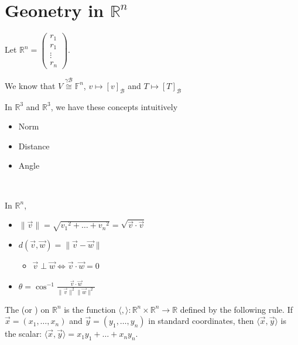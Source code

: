 \documentclass[11pt,fleqn]{book} %
\begin{document}
\section{Geonetry in $\mathbb{R}^n$}

Let $\mathbb{R}^n = \begin{pmatrix} r_1 \\ r_1 \\ \vdots \\ r_n \end{pmatrix}$. 

\noindent We know that $V \overset{\gamma\mathcal{B}}{\cong} \mathbb{F}^n$, $v \mapsto [v]_\mathcal{B}$ and $T \mapsto [T]_\mathcal{B}$

\noindent In $\mathbb{R}^3$ and $\mathbb{R}^3$, we have these concepts intuitively
\begin{itemize}
    \item Norm
    \item Distance
    \item Angle
\end{itemize}

{~~~}

\noindent In $\mathbb{R}^n$, 
\begin{itemize}
    \item $\|\vec{v}\| = \sqrt{{v_1}^2 + \dots + {v_n}^2} = \sqrt{\vec{v} \cdot \vec{v}}$
    \item $d(\vec{v}, \vec{w}) = \|\vec{v} - \vec{w}\|$
    \begin{itemize}
        \item $\vec{v} \perp \vec{w} \iff \vec{v} \cdot \vec{w} = 0$
    \end{itemize}
    \item $\theta = \cos^{-1}\frac{\vec{v} \cdot \vec{w}}{\|\vec{v}\|^2 \|\vec{w}\|^2}$
\end{itemize}

\setcounter{chapter}{4}\label{Def4_3_1}
\begin{definition}
    The  (or ) on $\mathbb{R}^n$ is the function $\langle , \rangle : \mathbb{R}^n \times \mathbb{R}^n \to \mathbb{R}$ defined by the following rule. If $\vec{x} = (x_1, \dots, x_n)$ and $\vec{y} =  (y_1, \dots, y_n)$ in standard coordinates, then $\langle \vec{x}, \vec{y} \rangle$ is the scalar: $\langle \vec{x}, \vec{y} \rangle = x_1y_1 + \dots + x_ny_n$. 
\end{definition}
\setcounter{chapter}{3}
\end{document}
